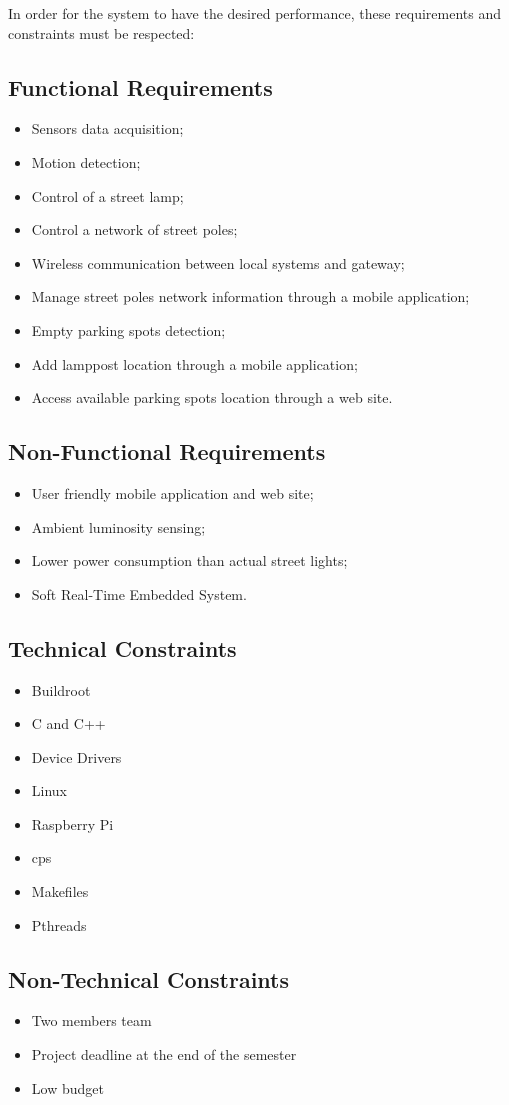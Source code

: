 In order for the system to have the desired performance, these requirements and constraints must be respected:
\subsection{Functional Requirements}
\begin{itemize}
	\item Sensors data acquisition;                          
	\item Motion detection;
	\item Control of a street lamp;
	\item Control a network of street poles;
	\item Wireless communication between local systems and gateway;
	\item Manage street poles network information through a mobile application;
	\item Empty parking spots detection;
	\item Add lamppost location through a mobile application;
	\item Access available parking spots location through a web site.
\end{itemize}

\subsection{Non-Functional Requirements}
\begin{itemize}
	\item User friendly mobile application and web site;
	\item Ambient luminosity sensing;
	\item Lower power consumption than actual street lights;
	\item Soft Real-Time Embedded System.
\end{itemize}

\subsection{Technical Constraints}
\begin{itemize}
	\item Buildroot
	\item C and C++ 
	\item Device Drivers
	\item Linux
	\item Raspberry Pi
	\item \ac{cps}
	\item Makefiles
	\item Pthreads
\end{itemize}

\subsection{Non-Technical Constraints}
\begin{itemize}
	\item Two members team
	\item Project deadline at the end of the semester
	\item Low budget
\end{itemize}